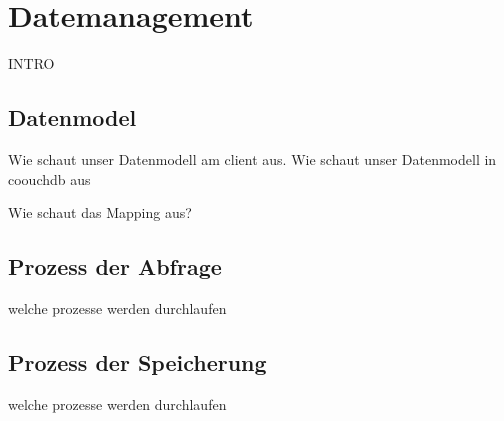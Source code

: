 \chapter{Datemanagement}
\label{chap:datenmanagement}

INTRO

\section{Datenmodel}
\label{sec:datenmodel}

Wie schaut unser Datenmodell am client aus.
Wie schaut unser Datenmodell in coouchdb aus

Wie schaut das Mapping aus?

\section{Prozess der Abfrage}
\label{sec:abfrage}
welche prozesse werden durchlaufen

\section{Prozess der Speicherung}
\label{sec:speicherung}
welche prozesse werden durchlaufen


